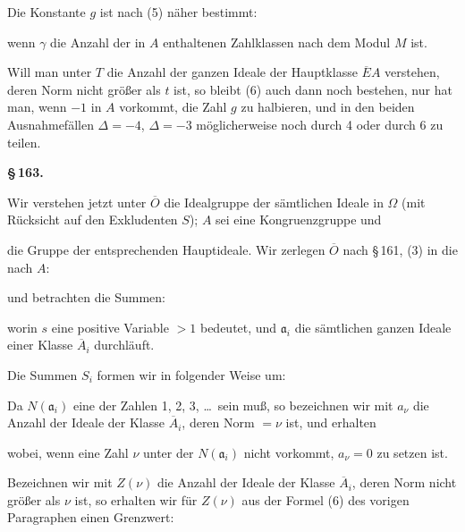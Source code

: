
Die Konstante $g$ ist nach (5) näher bestimmt:


wenn $\gamma$ die Anzahl der in $A$ enthaltenen Zahlklassen nach dem Modul $M$ ist.

Will man unter $T$ die Anzahl der ganzen Ideale der Hauptklasse $\overline{E}A$ verstehen, deren Norm nicht größer als $t$ ist, so bleibt (6) auch dann noch bestehen, nur hat man, wenn $-1$ in $A$ vorkommt, die Zahl $g$ zu halbieren, und in den beiden Ausnahmefällen $\Delta = -4$, $\Delta = -3$ möglicherweise noch durch 4 oder durch 6 zu teilen.

\begin{center}
\textbf{\S\,163.\qquad {}}
\end{center}

Wir verstehen jetzt unter $\overline{O}$ die Idealgruppe der sämtlichen Ideale in $\Omega$ (mit Rücksicht auf den Exkludenten $S$); $A$ sei eine Kongruenzgruppe und


die Gruppe der entsprechenden Hauptideale. Wir zerlegen $\overline{O}$ nach \S\,161, (3) in die  nach $A$:


und betrachten die Summen:


worin $s$ eine positive Variable $> 1$ bedeutet, und $\mathfrak{a}_i$ die sämtlichen ganzen Ideale einer Klasse $\overline{A}_i$ durchläuft.

Die Summen $S_i$ formen wir in folgender Weise um:

Da $N(\mathfrak{a}_i)$ eine der Zahlen 1, 2, 3, \dots\ sein muß, so bezeichnen wir mit $a_\nu$ die Anzahl der Ideale der Klasse $\overline{A}_i$, deren Norm $= \nu$ ist, und erhalten


wobei, wenn eine Zahl $\nu$ unter der $N(\mathfrak{a}_i)$ nicht vorkommt, $a_\nu = 0$ zu setzen ist.

Bezeichnen wir mit $Z(\nu)$ die Anzahl der Ideale der Klasse $\overline{A}_i$, deren Norm nicht größer als $\nu$ ist, so erhalten wir für $Z(\nu)$ aus der Formel (6) des vorigen Paragraphen einen Grenzwert:
